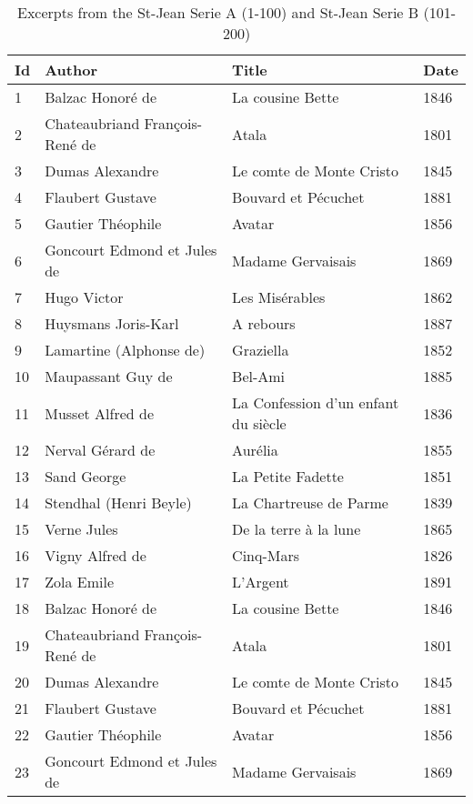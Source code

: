 \begin{center}
\begin{small}
\begin{longtable}{l l l l}
  \caption{Excerpts from the St-Jean Serie A (1-100) and St-Jean Serie B (101-200) \label{tbl:st_jean_corpus}} \\
  \endfirsthead
  \toprule
  \textbf{Id} &
  \textbf{Author} &
  \textbf{Title} &
  \textbf{Date} \\
  \midrule
  1 & Balzac Honoré de & La cousine Bette & 1846 \\
  2 & Chateaubriand François-René de & Atala & 1801 \\
  3 & Dumas Alexandre & Le comte de Monte Cristo & 1845 \\
  4 & Flaubert Gustave & Bouvard et Pécuchet & 1881 \\
  5 & Gautier Théophile & Avatar & 1856 \\
  6 & Goncourt Edmond et Jules de & Madame Gervaisais & 1869 \\
  7 & Hugo Victor & Les Misérables & 1862 \\
  8 & Huysmans Joris-Karl & A rebours & 1887 \\
  9 & Lamartine (Alphonse de) & Graziella & 1852 \\
  10 & Maupassant Guy de & Bel-Ami & 1885 \\
  11 & Musset Alfred de & La Confession d’un enfant du siècle & 1836 \\
  12 & Nerval Gérard de & Aurélia & 1855 \\
  13 & Sand George & La Petite Fadette & 1851 \\
  14 & Stendhal (Henri Beyle) & La Chartreuse de Parme & 1839 \\
  15 & Verne Jules & De la terre à la lune & 1865 \\
  16 & Vigny Alfred de & Cinq-Mars & 1826 \\
  17 & Zola Emile & L'Argent & 1891 \\
  18 & Balzac Honoré de & La cousine Bette & 1846 \\
  19 & Chateaubriand François-René de & Atala & 1801 \\
  20 & Dumas Alexandre & Le comte de Monte Cristo & 1845 \\
  21 & Flaubert Gustave & Bouvard et Pécuchet & 1881 \\
  22 & Gautier Théophile & Avatar & 1856 \\
  23 & Goncourt Edmond et Jules de & Madame Gervaisais & 1869 \\

\end{longtable}
\end{small}
\end{center}
